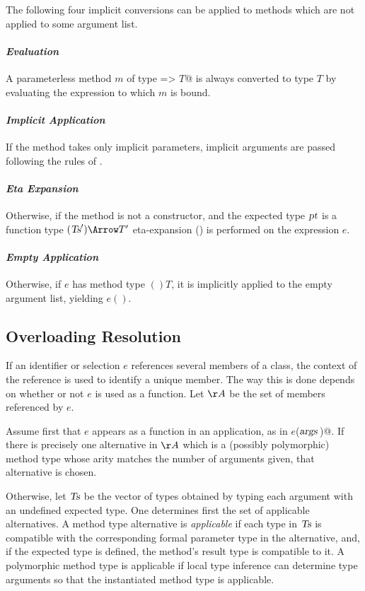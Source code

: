The following four implicit conversions can be applied to methods
which are not applied to some argument list.

\paragraph{\em Evaluation}
A parameterless method $m$ of type \lstinline@=> $T$@ is always converted to
type $T$ by evaluating the expression to which $m$ is bound.

\paragraph{\em Implicit Application}
  If the method takes only implicit parameters, implicit
  arguments are passed following the rules of .

\paragraph{\em Eta Expansion}
  Otherwise, if the method is not a constructor, 
  and the expected type $\mbox{\sl pt}$ is a function type
  $(\Ts') \Arrow T'$ eta-expansion
  () is performed on the
  expression $e$.

\paragraph{\em Empty Application}
  Otherwise, if $e$ has method type $()T$, it is implicitly applied to the empty
  argument list, yielding $e()$.

\subsection{Overloading Resolution}
\label{sec:overloading-resolution}

If an identifier or selection $e$ references several members of a
class, the context of the reference is used to identify a unique
member.  The way this is done depends on whether or not $e$ is used as
a function.  Let $\AA$ be the set of members referenced by $e$.

Assume first that $e$ appears as a function in an application, as
in \lstinline@$e$($\mbox{\sl args}\,$)@.  If there is precisely one alternative in
$\AA$ which is a (possibly polymorphic) method type whose arity
matches the number of arguments given, that alternative is chosen.

Otherwise, let $\mbox{\sl Ts}$ be the vector of types obtained by
typing each argument with an undefined expected type. One determines
first the set of applicable alternatives. A method type alternative is
{\em applicable} if each type in $\mbox{\sl Ts}$ is compatible with
the corresponding formal parameter type in the alternative, and, if 
the expected type is defined, the method's result type is compatible to
it.  A polymorphic method type is applicable if local type inference
can determine type arguments so that the instantiated method type is
applicable.

